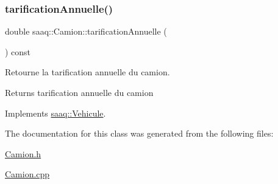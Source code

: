 \mbox{\label{classsaaq_1_1Camion_af01bdc48db3cdeb3bc29c8b864ffdad8}} 
\subsubsection{\texorpdfstring{tarification\+Annuelle()}{tarificationAnnuelle()}}
{\footnotesize\ttfamily double saaq\+::\+Camion\+::tarification\+Annuelle (\begin{DoxyParamCaption}{ }\end{DoxyParamCaption}) const\hspace{0.3cm}{\ttfamily [virtual]}}



Retourne la tarification annuelle du camion. 

\begin{DoxyReturn}{Returns}
tarification annuelle du camion 
\end{DoxyReturn}


Implements \hyperlink{classsaaq_1_1Vehicule_a93570921069d25b6bc48cf04af176395}{saaq\+::\+Vehicule}.



The documentation for this class was generated from the following files\+:\begin{DoxyCompactItemize}
\item 
\hyperlink{Camion_8h}{Camion.\+h}\item 
\hyperlink{Camion_8cpp}{Camion.\+cpp}\end{DoxyCompactItemize}
